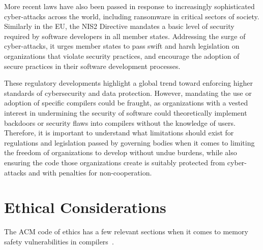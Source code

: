 \documentclass[sigconf, anonymous]{acmart}
\begin{document}
More recent laws have also been passed in response to increasingly sophisticated cyber-attacks across the world, including ransomware in critical sectors of society. Similarly in the EU, the NIS2 Directive mandates a basic level of security required by software developers in all member states\cite{nis2024}. Addressing the surge of cyber-attacks, it urges member states to pass swift and harsh legislation on organizations that violate security practices, and encourage the adoption of secure practices in their software development processes.

These regulatory developments highlight a global trend toward enforcing higher standards of cybersecurity and data protection. However, mandating the use or adoption of specific compilers could be fraught, as organizations with a vested interest in undermining the security of software could theoretically implement backdoors or security flaws into compilers without the knowledge of users. Therefore, it is important to understand what limitations should exist for regulations and legislation passed by governing bodies when it comes to limiting the freedom of organizations to develop without undue burdens, while also ensuring the code those organizations create is suitably protected from cyber-attacks and with penalties for non-cooperation.

\section{Ethical Considerations}
\label{ethical considerations}

The ACM code of ethics has a few relevant sections when it comes to memory safety vulnerabilities in compilers~\cite{ACMCODE}.
\end{document}
